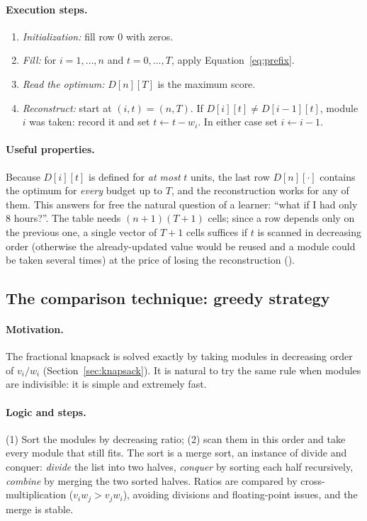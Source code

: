 \paragraph{Execution steps.}
\begin{enumerate}[leftmargin=1.6em,itemsep=1pt]
\item \emph{Initialization:} fill row $0$ with zeros.
\item \emph{Fill:} for $i=1,\dots,n$ and $t=0,\dots,T$, apply Equation~\eqref{eq:prefix}.
\item \emph{Read the optimum:} $D[n][T]$ is the maximum score.
\item \emph{Reconstruct:} start at $(i,t)=(n,T)$. If $D[i][t]\neq D[i-1][t]$, module $i$ was taken: record it and set $t\leftarrow t-w_i$. In either case set $i\leftarrow i-1$.
\end{enumerate}

\paragraph{Useful properties.} Because $D[i][t]$ is defined for \emph{at most} $t$ units, the last row $D[n][\cdot]$ contains the optimum for \emph{every} budget up to $T$, and the reconstruction works for any of them. This answers for free the natural question of a learner: ``what if I had only 8 hours?''. The table needs $(n+1)(T+1)$ cells; since a row depends only on the previous one, a single vector of $T+1$ cells suffices if $t$ is scanned in decreasing order (otherwise the already-updated value would be reused and a module could be taken several times) at the price of losing the reconstruction ().

\subsection{The comparison technique: greedy strategy}\label{sec:design-greedy}

\paragraph{Motivation.} The fractional knapsack is solved exactly by taking modules in decreasing order of $v_i/w_i$ (Section~\ref{sec:knapsack}). It is natural to try the same rule when modules are indivisible: it is simple and extremely fast.

\paragraph{Logic and steps.} (1) Sort the modules by decreasing ratio; (2) scan them in this order and take every module that still fits. The sort is a merge sort, an instance of divide and conquer: \emph{divide} the list into two halves, \emph{conquer} by sorting each half recursively, \emph{combine} by merging the two sorted halves. Ratios are compared by cross-multiplication ($v_iw_j > v_jw_i$), avoiding divisions and floating-point issues, and the merge is stable.

